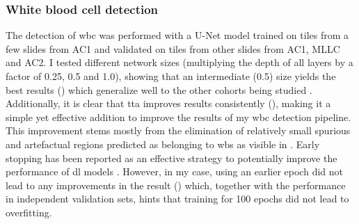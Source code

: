 
\subsubsection{White blood cell detection}

The detection of \ac{wbc} was performed with a U-Net model \cite{Ronneberger2015-do} trained on tiles from a few slides from AC1 and validated on tiles from other slides from AC1, MLLC and AC2. I tested different network sizes (multiplying the depth of all layers by a factor of 0.25, 0.5 and 1.0), showing that an intermediate (0.5) size yields the best results () which generalize well to the other cohorts being studied . Additionally, it is clear that \ac{tta} improves results consistently (), making it a simple yet effective addition to improve the results of my \ac{wbc} detection pipeline. This improvement stems mostly from the elimination of relatively small spurious and artefactual regions predicted as belonging to \ac{wbs} as visible in . Early stopping has been reported as an effective strategy to potentially improve the performance of \ac{dl} models \cite{Prechelt2012-xf}. However, in my case, using an earlier epoch did not lead to any improvements in the result () which, together with the performance in independent validation sets, hints that training for 100 epochs did not lead to overfitting. 

\begin{figure}[!ht]
    \label{fig:u-net-validation}
\end{figure}

\begin{figure}[!ht]
    \label{fig:u-net-early-stopping}
\end{figure}

\begin{figure}[!ht]
    \label{fig:wbc-segmentation-good}
\end{figure}


